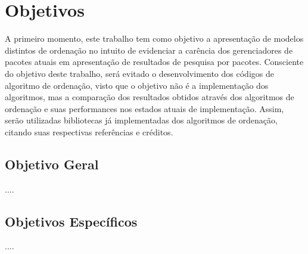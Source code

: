 \chapter{\nmu Objetivos}
\label{cha:objetivos}

A primeiro momento, este trabalho tem como objetivo a apresentação de modelos distintos de ordenação no intuito de evidenciar a carência dos gerenciadores de pacotes atuais em apresentação de resultados de pesquisa por pacotes. Consciente do objetivo deste trabalho, será evitado o desenvolvimento dos códigos de algoritmo de ordenação, visto que o objetivo não é a implementação dos algoritmos, mas a comparação dos resultados obtidos através dos algoritmos de ordenação e suas performances nos estados atuais de implementação. Assim, serão utilizadas bibliotecas já implementadas dos algoritmos de ordenação, citando suas respectivas referências e créditos.

\section{Objetivo Geral}

....

\section{Objetivos Específicos}


....

